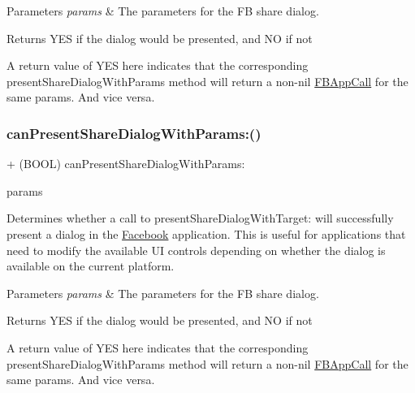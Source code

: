 \begin{DoxyParams}{Parameters}
{\em params} & The parameters for the FB share dialog.\\
\hline
\end{DoxyParams}
\begin{DoxyReturn}{Returns}
Y\+ES if the dialog would be presented, and NO if not
\end{DoxyReturn}
A return value of Y\+ES here indicates that the corresponding present\+Share\+Dialog\+With\+Params method will return a non-\/nil \hyperlink{interfaceFBAppCall}{F\+B\+App\+Call} for the same params. And vice versa. \mbox{\label{interfaceFBDialogs_a36e9e390bb8c6040e6027b647ed587e8}} 
\subsubsection{\texorpdfstring{can\+Present\+Share\+Dialog\+With\+Params\+:()}{canPresentShareDialogWithParams:()}\hspace{0.1cm}{\footnotesize\ttfamily [4/5]}}
{\footnotesize\ttfamily + (B\+O\+OL) can\+Present\+Share\+Dialog\+With\+Params\+: \begin{DoxyParamCaption}\item[{(\hyperlink{interfaceFBLinkShareParams}{F\+B\+Link\+Share\+Params} $\ast$)}]{params }\end{DoxyParamCaption}}

Determines whether a call to present\+Share\+Dialog\+With\+Target\+: will successfully present a dialog in the \hyperlink{interfaceFacebook}{Facebook} application. This is useful for applications that need to modify the available UI controls depending on whether the dialog is available on the current platform.


\begin{DoxyParams}{Parameters}
{\em params} & The parameters for the FB share dialog.\\
\hline
\end{DoxyParams}
\begin{DoxyReturn}{Returns}
Y\+ES if the dialog would be presented, and NO if not
\end{DoxyReturn}
A return value of Y\+ES here indicates that the corresponding present\+Share\+Dialog\+With\+Params method will return a non-\/nil \hyperlink{interfaceFBAppCall}{F\+B\+App\+Call} for the same params. And vice versa. \mbox{\label{interfaceFBDialogs_a36e9e390bb8c6040e6027b647ed587e8}} 
